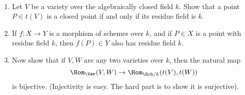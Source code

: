 \begin{exercise}%
	~
	\begin{enumerate}
		\item Let $V $ be a variety over the algebraically closed field $k $. Show that a point $P \in t(V) $ is a closed point if and only if its residue field is $k $.
		\item If $f: X\to Y $ is a morphism of schemes over $k $, and if $P \in X $ is a point with residue field $k $, then $f(P) \in Y $ also has residue field $k $.
		\item Now show that if $V,W $ are any two varieties over $k $, then the natural map
			\[
				\Hom_{\Var}(V,W) \to \Hom_{\Sch / k}(t(V),t(W))
			\] 
			is bijective. (Injectivity is easy. The hard part is to show it is surjective).
	\end{enumerate}
\end{exercise}
